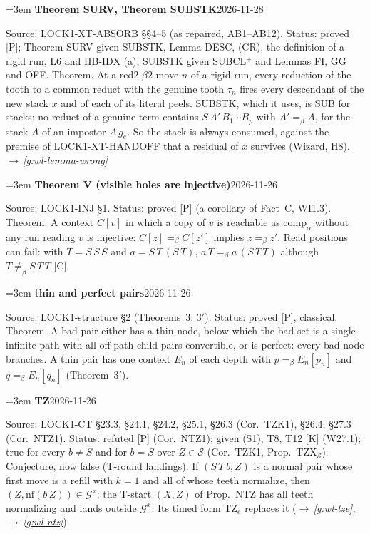 \documentclass[11pt]{amsart}
\makeatletter
\newcommand{\conv}{=_\beta}
\newcommand{\nf}{\mathrm{nf}}
\newcommand{\Gc}{\mathcal G}
\newcounter{sense}
\newenvironment{entry}[3]{%
  \par\addvspace{\medskipamount}\noindent\phantomsection
  \def\@currentlabel{#2}\label{#1}\setcounter{sense}{0}\raggedright\emergencystretch=3em%
  \textbf{#2}\hfill{\footnotesize\textsf{#3}}\par\nopagebreak\noindent\ignorespaces}%
  {\par}
\newcommand{\src}[1]{\textsf{Source:} #1.\enskip}
\newcommand{\status}[1]{\textsf{Status:} #1.\enskip}
\renewcommand{\see}[1]{$\rightarrow$\,\emph{\ref{#1}}}
\makeatother
\begin{document}
\begin{entry}{g:wl-surv}{Theorem SURV, Theorem SUBSTK}{2026-11-28}
\src{LOCK1-XT-ABSORB \S\S4--5 (as repaired, AB1--AB12)}
\status{proved [P]; Theorem SURV given SUBSTK, Lemma DESC, (CR), the definition of a rigid run, L6 and
HB-IDX (a); SUBSTK given SUBCL$^+$ and Lemmas FI, GG and OFF}
Theorem. At a red2 $\beta2$ move $n$ of a rigid run, every reduction of the tooth to a common reduct with
the genuine tooth $\tau_n$ fires every descendant of the new stack $x$ and of each of its literal peels. SUBSTK, which
it uses, is SUB for stacks: no reduct of a genuine term contains $S\,A'\,B_1\cdots B_p$ with $A'\conv A$, for
the stack $A$ of an impostor $A\,g_e$. So the stack is always consumed, against the premise of
LOCK1-XT-HANDOFF that a residual of $x$ survives (Wizard, H8). \see{g:wl-lemma-wrong}
\end{entry}

\begin{entry}{g:wl-theorem-v}{Theorem V (visible holes are injective)}{2026-11-26}
\src{LOCK1-INJ \S1}
\status{proved [P] (a corollary of Fact~C, WI1.3)}
Theorem. A context $C[v]$ in which a copy of $v$ is reachable as $\mathrm{comp}_\alpha$ without any run
reading $v$ is injective: $C[z]\conv C[z']$ implies $z\conv z'$. Read positions can fail: with
$T=S\,S\,S$ and $a=S\,T\,(S\,T)$, $a\,T\conv a\,(S\,T\,T)$ although $T\not\conv S\,T\,T$ [C].
\end{entry}

\begin{entry}{g:wl-thin-perfect}{thin and perfect pairs}{2026-11-26}
\src{LOCK1-structure \S2 (Theorems~3, 3$'$)}
\status{proved [P], classical}
Theorem. A bad pair either has a thin node, below which the bad set is a single infinite path with all
off-path child pairs convertible, or is perfect: every bad node branches. A thin pair has one context
$E_n$ of each depth with $p\conv E_n[p_n]$ and $q\conv E_n[q_n]$ (Theorem~3$'$).
\end{entry}

\begin{entry}{g:wl-tz}{TZ}{2026-11-26}
\src{LOCK1-CT \S23.3, \S24.1, \S24.2, \S25.1, \S26.3 (Cor.~TZK1), \S26.4, \S27.3 (Cor.~NTZ1)}
\status{refuted [P] (Cor.~NTZ1); given (S1), T8, T12 [K] (W27.1); true for every $b\ne S$ and for
$b=S$ over $Z\in\mathcal S$ (Cor.~TZK1, Prop.~TZX$_{\mathcal S}$)}
Conjecture, now false (T-round landings). If $(S\,T\,b,Z)$ is a normal pair whose first move is a
refill with $k=1$ and all of whose teeth normalize, then $(Z,\nf(b\,Z))\in\Gc^{x}$; the T-start $(X,Z)$
of Prop.~NTZ has all teeth normalizing and lands outside $\Gc^{x}$. Its timed form $\mathrm{TZ}_e$
replaces it (\see{g:wl-tze}, \see{g:wl-ntz}).
\end{entry}
\end{document}
